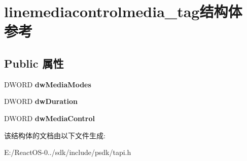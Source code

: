 \hypertarget{structlinemediacontrolmedia__tag}{}\section{linemediacontrolmedia\+\_\+tag结构体 参考}
\label{structlinemediacontrolmedia__tag}
\subsection*{Public 属性}
\begin{DoxyCompactItemize}
\item 
\mbox{\label{structlinemediacontrolmedia__tag_ad5cfe9d1b8f11085fd218b69030a4389}} 
D\+W\+O\+RD {\bfseries dw\+Media\+Modes}
\item 
\mbox{\label{structlinemediacontrolmedia__tag_a5ce57ad5121d4be8ea5b29e6516834f8}} 
D\+W\+O\+RD {\bfseries dw\+Duration}
\item 
\mbox{\label{structlinemediacontrolmedia__tag_afc0154dd6911720562e559247d27f954}} 
D\+W\+O\+RD {\bfseries dw\+Media\+Control}
\end{DoxyCompactItemize}


该结构体的文档由以下文件生成\+:\begin{DoxyCompactItemize}
\item 
E\+:/\+React\+O\+S-\/0../sdk/include/psdk/tapi.\+h\end{DoxyCompactItemize}
